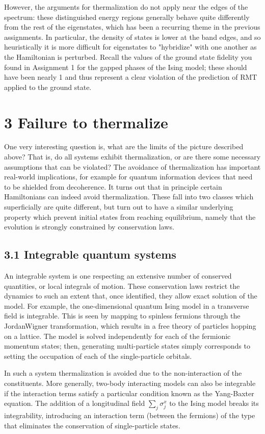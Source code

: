 \documentclass[12pt]{article}
\begin{document}
However, the arguments for thermalization do not apply near the edges of the spectrum: these distinguished energy regions generally behave quite differently from the rest of the eigenstates, which has been a recurring theme in the previous assignments. In particular, the density of states is lower at the band edges, and so heuristically it is more difficult for eigenstates to "hybridize" with one another as the Hamiltonian is perturbed. Recall the values of the ground state fidelity you found in Assignment 1 for the gapped phases of the Ising model; these should have been nearly 1 and thus represent a clear violation of the prediction of RMT applied to the ground state.

\section*{3 Failure to thermalize}
One very interesting question is, what are the limits of the picture described above? That is, do all systems exhibit thermalization, or are there some necessary assumptions that can be violated? The avoidance of thermalization has important real-world implications, for example for quantum information devices that need to be shielded from decoherence. It turns out that in principle certain Hamiltonians can indeed avoid thermalization. These fall into two classes which superficially are quite different, but turn out to have a similar underlying property which prevent initial states from reaching equilibrium, namely that the evolution is strongly constrained by conservation laws.

\subsection*{3.1 Integrable quantum systems}
An integrable system is one respecting an extensive number of conserved quantities, or local integrals of motion. These conservation laws restrict the dynamics to such an extent that, once identified, they allow exact solution of the model. For example, the one-dimensional quantum Ising model in a transverse field is integrable. This is seen by mapping to spinless fermions through the JordanWigner transformation, which results in a free theory of particles hopping on a lattice. The model is solved independently for each of the fermionic momentum states; then, generating multi-particle states simply corresponds to setting the occupation of each of the single-particle orbitals.

In such a system thermalization is avoided due to the non-interaction of the constituents. More generally, two-body interacting models can also be integrable if the interaction terms satisfy a particular condition known as the Yang-Baxter equation. The addition of a longitudinal field $\sum_{j} \sigma_{j}^{x}$ to the Ising model breaks its integrability, introducing an interaction term (between the fermions) of the type that eliminates the conservation of single-particle states.
\end{document}
